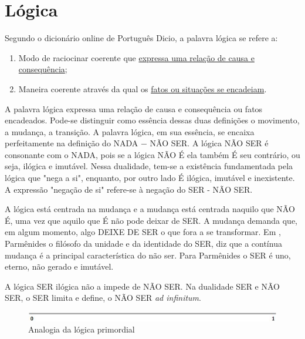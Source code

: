 \section{Lógica}
Segundo o dicionário online de Português Dicio\cite{dicio_logica}, a palavra lógica se refere a:
\begin{enumerate}
   \item Modo de raciocinar coerente que \underline{expressa uma relação de causa e consequência};
   \item Maneira coerente através da qual os \underline{fatos ou situações se encadeiam}. 
\end{enumerate}
 
\bigbreak
A palavra lógica expressa uma relação de causa e consequência ou fatos encadeados. Pode-se distinguir como essência dessas duas definições o movimento, a mudança, a transição. A palavra lógica, em sua essência, se encaixa perfeitamente na definição do NADA − NÃO SER.  A lógica NÃO SER é consonante com o NADA, pois se a lógica NÃO É ela também É seu contrário, ou seja, ilógica e imutável. Nessa dualidade, tem-se a existência fundamentada pela lógica que "nega a si", enquanto, por outro lado É ilógica, imutável e inexistente. A expressão "negação de si" refere-se à negação do SER - NÃO SER. 

A lógica está centrada na mudança e a mudança está centrada naquilo que NÃO É, uma vez que aquilo que É não pode deixar de SER. A mudança demanda que, em algum momento, algo DEIXE DE SER o que fora a se transformar. Em , Parmênides  o filósofo da unidade e da identidade do SER, diz que a contínua mudança é a principal característica do não ser. Para Parmênides o SER é uno, eterno, não gerado e imutável.

A lógica SER ilógica não a impede de NÃO SER. Na dualidade SER e NÃO SER, o SER limita e define, o NÃO SER \textit{ad infinitum}.
\begin{figure}[H]
\caption{Analogia da lógica primordial}
\label{fig:primordial_logic_representation}
\centering
\includegraphics[scale=1]{sections/images/primordial_logic_representation.jpg}
\end{figure}


